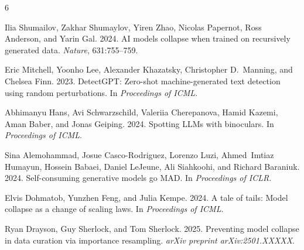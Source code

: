 \documentclass[11pt,a4paper]{article}
\begin{document}
\begin{thebibliography}{6}

Ilia Shumailov, Zakhar Shumaylov, Yiren Zhao, Nicolas Papernot, Ross Anderson, and Yarin Gal. 2024.
AI models collapse when trained on recursively generated data.
\emph{Nature}, 631:755--759.

Eric Mitchell, Yoonho Lee, Alexander Khazatsky, Christopher D.~Manning, and Chelsea Finn. 2023.
{DetectGPT}: Zero-shot machine-generated text detection using random perturbations.
In \emph{Proceedings of ICML}.

Abhimanyu Hans, Avi Schwarzschild, Valeriia Cherepanova, Hamid Kazemi, Aman Baber, and Jonas Geiping. 2024.
Spotting {LLM}s with binoculars.
In \emph{Proceedings of ICML}.

Sina Alemohammad, Josue Casco-Rodriguez, Lorenzo Luzi, Ahmed~Imtiaz Humayun, Hossein Babaei, Daniel LeJeune, Ali Siahkoohi, and Richard Baraniuk. 2024.
Self-consuming generative models go {MAD}.
In \emph{Proceedings of ICLR}.

Elvis Dohmatob, Yunzhen Feng, and Julia Kempe. 2024.
A tale of tails: Model collapse as a change of scaling laws.
In \emph{Proceedings of ICML}.

Ryan Drayson, Guy Sherlock, and Tom Sherlock. 2025.
Preventing model collapse in data curation via importance resampling.
\emph{arXiv preprint arXiv:2501.XXXXX}.

\end{thebibliography}
\end{document}
